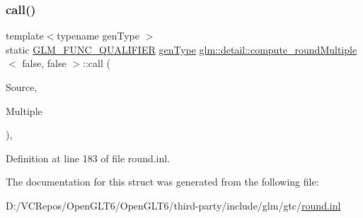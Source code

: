 \subsubsection{\texorpdfstring{call()}{call()}}
{\footnotesize\ttfamily template$<$typename gen\+Type $>$ \\
static \mbox{\hyperlink{setup_8hpp_a33fdea6f91c5f834105f7415e2a64407}{G\+L\+M\+\_\+\+F\+U\+N\+C\+\_\+\+Q\+U\+A\+L\+I\+F\+I\+ER}} \mbox{\hyperlink{structglm_1_1detail_1_1gen_type}{gen\+Type}} \mbox{\hyperlink{structglm_1_1detail_1_1compute__round_multiple}{glm\+::detail\+::compute\+\_\+round\+Multiple}}$<$ false, false $>$\+::call (\begin{DoxyParamCaption}\item[{\mbox{\hyperlink{structglm_1_1detail_1_1gen_type}{gen\+Type}}}]{Source,  }\item[{\mbox{\hyperlink{structglm_1_1detail_1_1gen_type}{gen\+Type}}}]{Multiple }\end{DoxyParamCaption})\hspace{0.3cm}{\ttfamily [inline]}, {\ttfamily [static]}}



Definition at line 183 of file round.\+inl.



The documentation for this struct was generated from the following file\+:\begin{DoxyCompactItemize}
\item 
D\+:/\+V\+C\+Repos/\+Open\+G\+L\+T6/\+Open\+G\+L\+T6/third-\/party/include/glm/gtc/\mbox{\hyperlink{round_8inl}{round.\+inl}}\end{DoxyCompactItemize}
